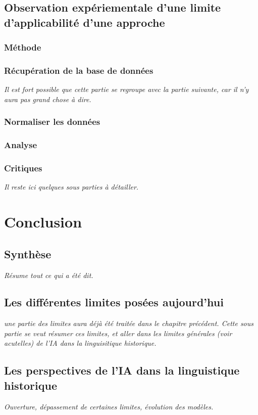 \documentclass[12pt, french, twoside]{report}
\begin{document}
\section{Observation expériementale d'une limite d'applicabilité d'une approche}
\subsection{Méthode}
\subsection{Récupération de la base de données}
\textit{Il est fort possible que cette partie se regroupe avec la partie suivante, car il n'y aura pas grand chose à dire.}

\subsection{Normaliser les données}

\subsection{Analyse}
\subsection{Critiques}
\textit{Il reste ici quelques sous parties à détailler.}

\chapter{Conclusion}
\section{Synthèse}
\textit{Résume tout ce qui a été dit.}
\section{Les différentes limites posées aujourd'hui}
\textit{une partie des limites aura déjà été traitée dans le chapitre précédent. Cette sous partie se veut résumer ces limites, et aller dans les limites générales (voir acutelles) de l'IA dans  la linguisitique historique.}
\section{Les perspectives de l'IA dans la linguistique historique}
\textit{Ouverture, dépassement de certaines limites, évolution des modèles.}

\printbibliography[heading=bibintoc]
\end{document}
